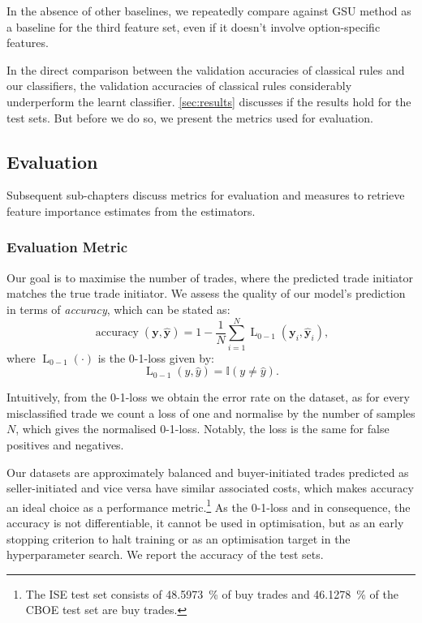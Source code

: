 In the absence of other baselines, we repeatedly compare against \gls{GSU} method as a baseline for the third feature set, even if it doesn't involve option-specific features.

In the direct comparison between the validation accuracies of classical rules and our classifiers, the validation accuracies of classical rules considerably underperform the learnt classifier. \cref{sec:results} discusses if the results hold for the test sets. But before we do so, we present the metrics used
for evaluation.

\subsection{Evaluation}\label{sec:evaluation}

Subsequent sub-chapters discuss metrics for evaluation and measures to retrieve feature importance estimates from the estimators.

\subsubsection{Evaluation Metric}\label{sec:evaluation-metric}

Our goal is to maximise the number of trades, where the predicted trade initiator matches the true trade initiator. We assess the quality of our model’s prediction in terms of \emph{accuracy}, which can be stated as:
\begin{equation}
    \operatorname{accuracy}(\mathbf{y}, \widehat{\mathbf{y}}) = 1 - \frac{1}{N}\sum_{i=1}^{N} \operatorname{L}_{\mathrm{0-1}}(\mathbf{y}_i, \widehat{\mathbf{y}}_i),
\end{equation}
where $\operatorname{L}_{\mathrm{0-1}}(\cdot)$ is the 0-1-loss given by:
\begin{equation}
    \operatorname{L}_{\mathrm{0-1}}(y, \hat{y}) = \mathbb{I}\left(y\neq \hat{y}\right).
\end{equation}

Intuitively, from the 0-1-loss we obtain the error rate on the dataset, as for every misclassified trade we count a loss of one and normalise by the number of samples $N$, which gives the normalised 0-1-loss. Notably, the loss is the same for false positives and negatives.

Our datasets are approximately balanced and buyer-initiated trades predicted as seller-initiated and vice versa have similar associated costs, which makes accuracy an ideal choice as a performance metric.\footnote{The \gls{ISE} test set consists of \SI{48.5973}{\percent} of buy trades and \SI{46.1278}{\percent} of the \gls{CBOE} test set are buy trades.} As the 0-1-loss and in consequence, the accuracy is not differentiable, it cannot be used in optimisation, but as an early stopping criterion to halt training or as an optimisation target in the hyperparameter search. We report the accuracy of the test sets.

